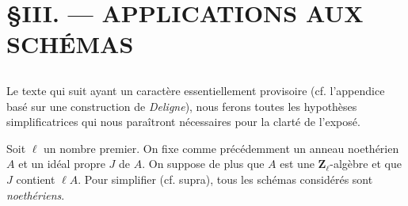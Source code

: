 \chapter*{\S \space III. --- APPLICATIONS AUX SCHÉMAS}\thispagestyle{empty}
\label{sec:1}
\section*{}

Le texte qui suit ayant un caractère essentiellement provisoire (cf. l'appendice basé sur une construction de \emph{Deligne}), nous ferons toutes les hypothèses simplificatrices qui nous paraîtront nécessaires pour la clarté de l'exposé.

Soit $\ell$ un nombre premier. On fixe comme précédemment un anneau noethérien $A$ et un idéal propre $J$ de $A$. On suppose de plus que $A$ est une $\mathbf{Z}_{\ell}$-algèbre et que $J$ contient $\ell A$. Pour simplifier (cf. supra), tous les schémas considérés sont \emph{noethériens}.
